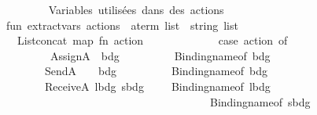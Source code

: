 \begin{isabellebody}
\ \ \ \ \isanewline
\ \ \ \ \ \ \ \ {\isacharparenleft}{\kern0pt}{\isacharasterisk}{\kern0pt}\ {\isacharminus}{\kern0pt}{\isacharminus}{\kern0pt}{\isacharminus}{\kern0pt}{\isacharminus}{\kern0pt}{\isacharminus}{\kern0pt}{\isacharminus}{\kern0pt}{\isacharminus}{\kern0pt}{\isacharminus}{\kern0pt}{\isacharminus}{\kern0pt}{\isacharminus}{\kern0pt}{\isacharminus}{\kern0pt}{\isacharminus}{\kern0pt}{\isacharminus}{\kern0pt}{\isacharminus}{\kern0pt}{\isacharminus}{\kern0pt}{\isacharminus}{\kern0pt}{\isacharminus}{\kern0pt}{\isacharminus}{\kern0pt}\ {}{\isachardot}{\kern0pt}\ Variables\ utilisées\ dans\ des\ actions\ {\isacharminus}{\kern0pt}{\isacharminus}{\kern0pt}{\isacharminus}{\kern0pt}{\isacharminus}{\kern0pt}{\isacharminus}{\kern0pt}\ {\isacharasterisk}{\kern0pt}{\isacharparenright}{\kern0pt}\isanewline
\ \ \ \ \ \ \ \ fun\ extract{\isacharunderscore}{\kern0pt}vars\ {\isacharparenleft}{\kern0pt}actions\ {\isacharcolon}{\kern0pt}\ a{\isacharunderscore}{\kern0pt}term\ list{\isacharparenright}{\kern0pt}\ {\isacharcolon}{\kern0pt}\ string\ list\ {\isacharequal}{\kern0pt}\isanewline
\ \ \ \ \ \ \ \ \ \ List{\isachardot}{\kern0pt}concat\ {\isacharparenleft}{\kern0pt}map\ {\isacharparenleft}{\kern0pt}fn\ action\ {\isacharequal}{\kern0pt}{\isachargreater}{\kern0pt}\isanewline
\ \ \ \ \ \ \ \ \ \ \ \ case\ action\ of\isanewline
\ \ \ \ \ \ \ \ \ \ \ \ \ \ \ \ AssignA\ \ {\isacharparenleft}{\kern0pt}bdg{\isacharcomma}{\kern0pt}\ {\isacharunderscore}{\kern0pt}{\isacharparenright}{\kern0pt}\ \ \ \ \ \ \ \ {\isacharequal}{\kern0pt}{\isachargreater}{\kern0pt}\ {\isacharbrackleft}{\kern0pt}Binding{\isachardot}{\kern0pt}name{\isacharunderscore}{\kern0pt}of\ bdg{\isacharbrackright}{\kern0pt}\isanewline
\ \ \ \ \ \ \ \ \ \ \ \ \ \ {\isacharbar}{\kern0pt}\ SendA\ \ \ \ {\isacharparenleft}{\kern0pt}bdg{\isacharcomma}{\kern0pt}\ {\isacharunderscore}{\kern0pt}{\isacharparenright}{\kern0pt}\ \ \ \ \ \ \ \ {\isacharequal}{\kern0pt}{\isachargreater}{\kern0pt}\ {\isacharbrackleft}{\kern0pt}Binding{\isachardot}{\kern0pt}name{\isacharunderscore}{\kern0pt}of\ bdg{\isacharbrackright}{\kern0pt}\isanewline
\ \ \ \ \ \ \ \ \ \ \ \ \ \ {\isacharbar}{\kern0pt}\ ReceiveA\ {\isacharparenleft}{\kern0pt}lbdg{\isacharcomma}{\kern0pt}\ sbdg{\isacharparenright}{\kern0pt}\ \ \ \ {\isacharequal}{\kern0pt}{\isachargreater}{\kern0pt}\ {\isacharbrackleft}{\kern0pt}Binding{\isachardot}{\kern0pt}name{\isacharunderscore}{\kern0pt}of\ lbdg{\isacharcomma}{\kern0pt}\isanewline
\ \ \ \ \ \ \ \ \ \ \ \ \ \ \ \ \ \ \ \ \ \ \ \ \ \ \ \ \ \ \ \ \ \ \ \ \ \ \ \ \ \ \ \ \ Binding{\isachardot}{\kern0pt}name{\isacharunderscore}{\kern0pt}of\ sbdg{\isacharbrackright}{\kern0pt}\isanewline

\end{isabellebody}
